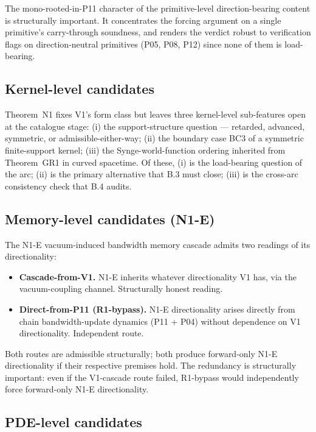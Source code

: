 \documentclass[11pt,a4paper]{article}
\begin{document}
The mono-rooted-in-P11 character of the primitive-level direction-bearing content is structurally important. It concentrates the forcing argument on a single primitive's carry-through soundness, and renders the verdict robust to verification flags on direction-neutral primitives (P05, P08, P12) since none of them is load-bearing.

\subsection{Kernel-level candidates}

Theorem~N1 fixes V1's form class but leaves three kernel-level sub-features open at the catalogue stage: (i) the support-structure question --- retarded, advanced, symmetric, or admissible-either-way; (ii) the boundary case BC3 of a symmetric finite-support kernel; (iii) the Synge-world-function ordering inherited from Theorem~GR1 in curved spacetime. Of these, (i) is the load-bearing question of the arc; (ii) is the primary alternative that B.3 must close; (iii) is the cross-arc consistency check that B.4 audits.

\subsection{Memory-level candidates (N1-E)}

The N1-E vacuum-induced bandwidth memory cascade admits two readings of its directionality:
\begin{itemize}[leftmargin=1.5em]
  \item \textbf{Cascade-from-V1.} N1-E inherits whatever directionality V1 has, via the vacuum-coupling channel. Structurally honest reading.
  \item \textbf{Direct-from-P11 (R1-bypass).} N1-E directionality arises directly from chain bandwidth-update dynamics (P11 + P04) without dependence on V1 directionality. Independent route.
\end{itemize}

Both routes are admissible structurally; both produce forward-only N1-E directionality if their respective premises hold. The redundancy is structurally important: even if the V1-cascade route failed, R1-bypass would independently force forward-only N1-E directionality.

\subsection{PDE-level candidates}
\end{document}
